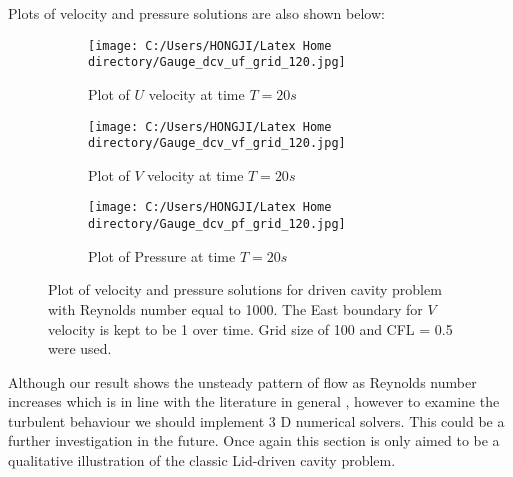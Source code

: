 Plots of velocity and pressure solutions are also shown below:
\begin{figure}[H]
	\centering
	\begin{subfigure}[t]{2.5in}
		\centering
		\texttt{[image: C:/Users/HONGJI/Latex Home directory/Gauge\_dcv\_uf\_grid\_120.jpg]}
		\caption{Plot of $U$ velocity at time $T = 20s$}\label{fig:6.21a}		
	\end{subfigure}
	\quad
	\begin{subfigure}[t]{2.5in}
		\centering
		\texttt{[image: C:/Users/HONGJI/Latex Home directory/Gauge\_dcv\_vf\_grid\_120.jpg]}
		\caption{Plot of $V$ velocity at time $T = 20s$}\label{fig:6.21b}
	\end{subfigure}
	\quad
	\centering
	\begin{subfigure}[t]{3.5in}
		\centering
		\texttt{[image: C:/Users/HONGJI/Latex Home directory/Gauge\_dcv\_pf\_grid\_120.jpg]}
		\caption{Plot of Pressure at time $T = 20s$}\label{fig:6.21c}		
	\end{subfigure}
	\caption{Plot of velocity and pressure solutions for driven cavity problem with Reynolds number equal to 1000. The East boundary for $V$ velocity is kept to be 1 over time. Grid size of 100 and CFL = 0.5 were used.}\label{fig:6.16}
\end{figure}

Although our result shows the unsteady pattern of flow as Reynolds number increases which is in line with the literature in general \cite{botella1998benchmark, erturk2005numerical, bruneau20062d}, however to examine the turbulent behaviour we should implement 3 D numerical solvers. This could be a further investigation in the future. Once again this section is only aimed to be a qualitative illustration of the classic Lid-driven cavity problem. 